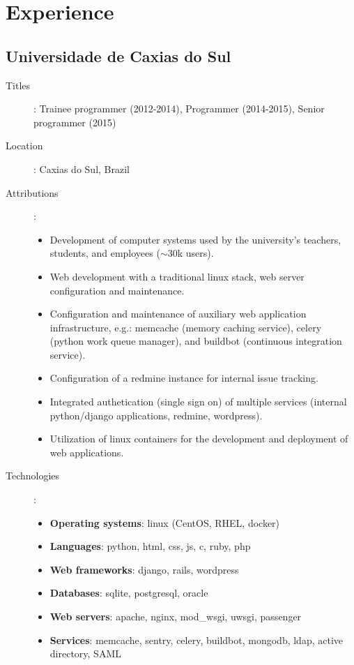 \section*{Experience}
\label{sec:professional}

\subsection*{Universidade de Caxias do Sul}

\begin{description}
    \item[Titles]:
        Trainee programmer (2012-2014), Programmer (2014-2015), Senior
        programmer (2015)
    \item[Location]: Caxias do Sul, Brazil
    \item[Attributions]:
        \begin{itemize}
            \item
                Development of computer systems used by the university's
                teachers, students, and employees ($\sim$30k users).
            \item
                Web development with a traditional linux stack, web server
                configuration and maintenance.
            \item
                Configuration and maintenance of auxiliary web application
                infrastructure, e.g.: memcache (memory caching service), celery
                (python work queue manager), and buildbot (continuous
                integration service).
            \item
                Configuration of a redmine instance for internal issue
                tracking.
            \item
                Integrated authetication (single sign on) of multiple services
                (internal python/django applications, redmine, wordpress).
            \item
                Utilization of linux containers for the development and
                deployment of web applications.
        \end{itemize}
    \item[Technologies]:
        \begin{itemize}
            \item \textbf{Operating systems}: linux (CentOS, RHEL, docker)
            \item \textbf{Languages}: python, html, css, js, c, ruby, php
            \item \textbf{Web frameworks}: django, rails, wordpress
            \item \textbf{Databases}: sqlite, postgresql, oracle
            \item \textbf{Web servers}:
                apache, nginx, mod\_wsgi, uwsgi, passenger
            \item \textbf{Services}:
                memcache, sentry, celery, buildbot, mongodb, ldap, active
                directory, SAML
        \end{itemize}
\end{description}

